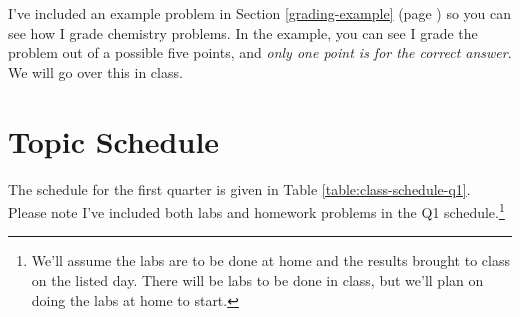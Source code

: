 \documentclass[11pt, oneside]{article}   	%
\begin{document}
I've included an example problem in Section  \ref{grading-example}  (page \pageref{grading-example}) so you can see how I grade chemistry problems.
In the example, you can see I grade the problem out of a possible five points, and \emph{only one point is for the correct answer}.  We will go over this in class.


\section{Topic Schedule}
The schedule for the first quarter is given in Table \ref{table:class-schedule-q1}.
Please note I've included both labs and homework problems in the Q1 schedule.\footnote{We'll assume the labs are to be done at home and the results brought to class on the listed day. There will be labs to be done in class, but we'll plan on doing the labs at home to start.}
\end{document}
